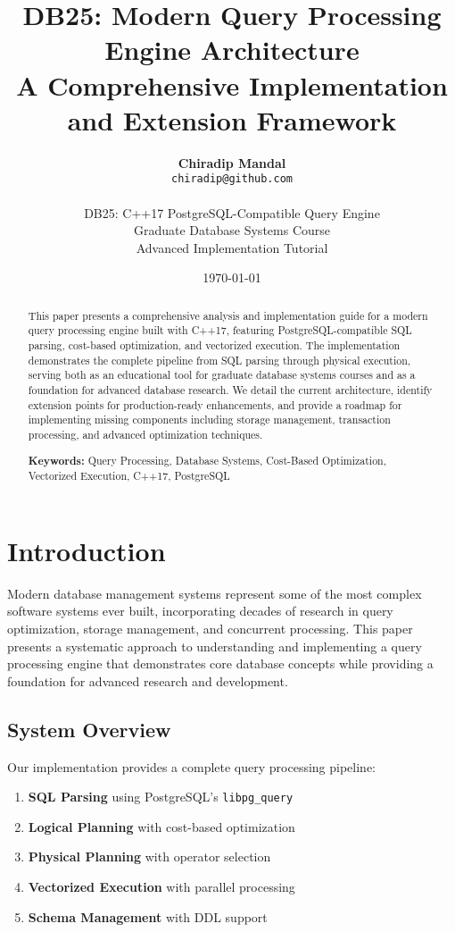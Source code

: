 \documentclass[12pt,a4paper]{article}
\title{\textbf{DB25: Modern Query Processing Engine Architecture \\
A Comprehensive Implementation and Extension Framework}}
\author{
    \textbf{Chiradip Mandal} \\
    \texttt{chiradip@github.com} \\
    \\
    DB25: C++17 PostgreSQL-Compatible Query Engine \\
    Graduate Database Systems Course \\
    Advanced Implementation Tutorial
}
\date{\today}
\begin{document}
    \maketitle

    \begin{abstract}
        This paper presents a comprehensive analysis and implementation guide for a modern query processing engine built with C++17, featuring PostgreSQL-compatible SQL parsing, cost-based optimization, and vectorized execution. The implementation demonstrates the complete pipeline from SQL parsing through physical execution, serving both as an educational tool for graduate database systems courses and as a foundation for advanced database research. We detail the current architecture, identify extension points for production-ready enhancements, and provide a roadmap for implementing missing components including storage management, transaction processing, and advanced optimization techniques.

        \textbf{Keywords:} Query Processing, Database Systems, Cost-Based Optimization, Vectorized Execution, C++17, PostgreSQL
    \end{abstract}

    \tableofcontents
    \newpage

    \section{Introduction}

    Modern database management systems represent some of the most complex software systems ever built, incorporating decades of research in query optimization, storage management, and concurrent processing. This paper presents a systematic approach to understanding and implementing a query processing engine that demonstrates core database concepts while providing a foundation for advanced research and development.

    \subsection{System Overview}

    Our implementation provides a complete query processing pipeline:

    \begin{enumerate}
        \item \textbf{SQL Parsing} using PostgreSQL's \texttt{libpg\_query}
        \item \textbf{Logical Planning} with cost-based optimization
        \item \textbf{Physical Planning} with operator selection
        \item \textbf{Vectorized Execution} with parallel processing
        \item \textbf{Schema Management} with DDL support
    \end{enumerate}
\end{document}
